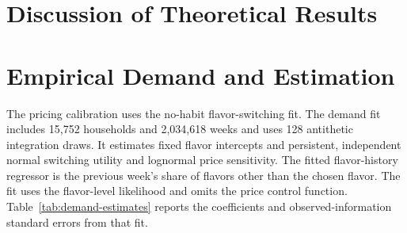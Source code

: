 \documentclass[12pt]{article}
\theoremstyle{definition}
\theoremstyle{remark}
\begin{document}
% 

\section{Discussion of Theoretical Results}
\label{sec:theory-discussion}


\section{Empirical Demand and Estimation}
\label{sec:estimation}
The pricing calibration uses the no-habit flavor-switching fit. The demand
fit includes 15,752 households and 2,034,618 weeks and uses 128 antithetic
integration draws. It estimates fixed flavor intercepts and persistent,
independent normal switching utility and lognormal price sensitivity.
The fitted flavor-history regressor is the previous week's share of flavors
other than the chosen flavor. The fit uses the flavor-level likelihood and
omits the price control function. Table~\ref{tab:demand-estimates} reports
the coefficients and observed-information standard errors from that fit.


\FloatBarrier
\end{document}
